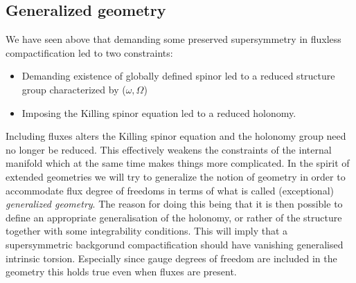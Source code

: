 \subsection{Generalized geometry}
We have seen above that demanding some preserved supersymmetry in fluxless compactification led to two constraints:
\begin{itemize}
    \item Demanding existence of globally defined spinor led to a reduced structure group characterized by ($\omega,\Omega$)
    \item Imposing the Killing spinor equation led to a reduced holonomy. 
\end{itemize}
Including fluxes alters the Killing spinor equation and the holonomy group need no longer be reduced. This effectively weakens the constraints of the internal manifold which at the same time makes things more complicated. In the spirit of extended geometries we will try to generalize the notion of geometry in order to accommodate flux degree of freedoms in terms of what is called (exceptional) \emph{generalized geometry}. The reason for doing this being that it is then possible to define an appropriate generalisation of the holonomy, or rather of the structure together with some integrability conditions. This will imply that a supersymmetric backgorund compactification should have vanishing generalised intrinsic torsion. Especially since gauge degrees of freedom are included in the geometry this holds true even when fluxes are present. 

